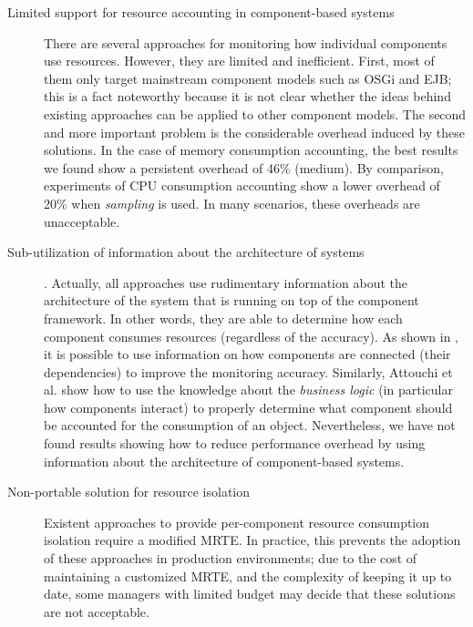 \begin{description}

\item[Limited support for resource accounting in component-based systems] There are several approaches for monitoring how individual components use resources.
However, they are limited and inefficient.
First, most of them only target mainstream component models such as OSGi and EJB; this is a fact noteworthy because it is not clear whether the ideas behind existing approaches can be applied to other component models.
The second and more important problem is the considerable overhead induced by these solutions.
In the case of memory consumption accounting, the best results we found show a persistent overhead of 46\% (medium).
By comparison, experiments of CPU consumption accounting show a lower overhead of 20\% when \textit{sampling} is used.
In many scenarios, these overheads are unacceptable. 

\item[Sub-utilization of information about the architecture of systems].
Actually, all approaches use rudimentary information about the architecture of the system that is running on top of the component framework.
In other words, they are able to determine how each component consumes resources (regardless of the accuracy).
As shown in \cite{Maurel:2012:AME:2304736.2304763}, it is possible to use information on how components are connected (their dependencies) to improve the monitoring accuracy.
Similarly, Attouchi et al. \cite{Attouchi:2014:MMM:2602458.2602467} show how to use the knowledge about the \textit{business logic} (in particular how components interact) to properly determine what component should be accounted for the consumption of an object.
Nevertheless, we have not found results showing how to reduce performance overhead by using information about the architecture of component-based systems. 


\item[Non-portable solution for resource isolation] Existent approaches to provide per-component resource consumption isolation require a modified MRTE.
In practice, this prevents the adoption of these approaches in production environments; due to the cost of maintaining a customized MRTE, and the complexity of keeping it up to date, some managers with limited budget may decide that these solutions are not acceptable.



\end{description}
